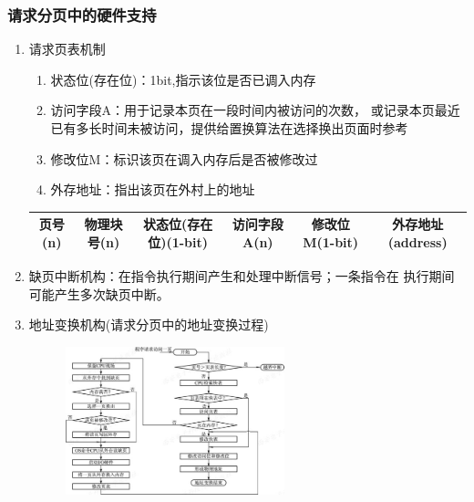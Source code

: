 \documentclass{article}
\begin{document}
\subsubsection{\color{red}请求分页中的硬件支持}
\begin{enumerate}
    \item 请求页表机制
    
\begin{enumerate}
    \item 状态位(存在位)：1bit,指示该位是否已调入内存
    \item 访问字段A：用于记录本页在一段时间内被访问的次数，
    或记录本页最近已有多长时间未被访问，提供给置换算法在选择换出页面时参考
    \item 修改位M：标识该页在调入内存后是否被修改过
    \item 外存地址：指出该页在外村上的地址
\end{enumerate}
\vspace*{-0.8cm}
\begin{center}
    \begin{tabular}{|c|c|c|c|c|c|}
        \hline
        {\color{gray}页号}{\color{red}(n)} & {\color{gray}物理块号}{\color{red}(n)} 
        & 状态位(存在位){\color{red}(1-bit)} & 访问字段A{\color{red}(n)} 
        & 修改位M{\color{red}(1-bit)} & 外存地址{\color{red}(address)} \\
        \hline
    \end{tabular}
\end{center}
    \item 缺页中断机构：在指令执行期间产生和处理中断信号；一条指令在
    执行期间可能产生多次缺页中断。
    \item 地址变换机构(请求分页中的地址变换过程)
    \clearpage
    \begin{figure}[h]
        \centering
        \includegraphics[width=0.6\textwidth]{请求分页地址变化.png}
    \end{figure} 
\end{enumerate}
\end{document}
